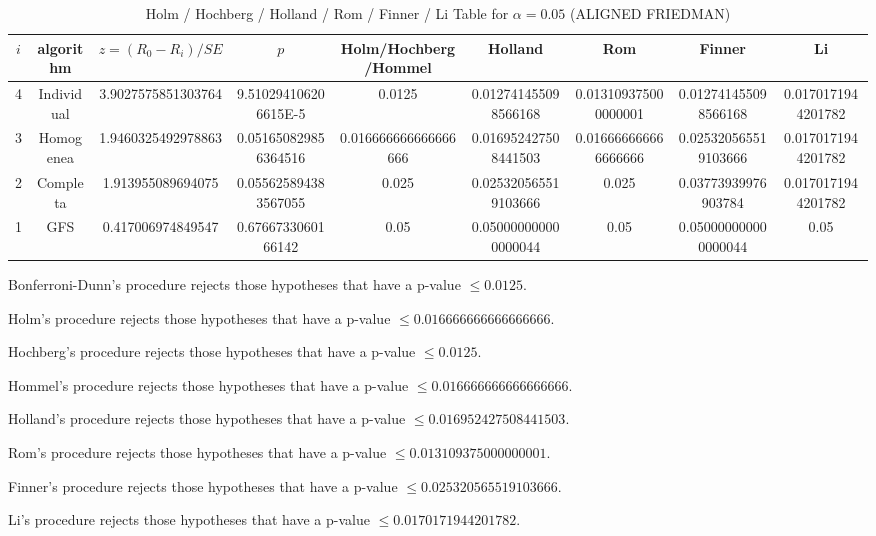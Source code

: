 \documentclass[a4paper,10pt]{article}
\begin{document}
\begin{landscape}
\begin{table}[!htp]
\centering\scriptsize
\caption{Holm / Hochberg / Holland / Rom / Finner / Li Table for $\alpha=0.05$ (ALIGNED FRIEDMAN)}
\begin{tabular}{ccccccccc}
$i$&algorithm&$z=(R_0 - R_i)/SE$&$p$&Holm/Hochberg/Hommel&Holland&Rom&Finner&Li\\
\hline
4&Individual&3.9027575851303764&9.510294106206615E-5&0.0125&0.012741455098566168&0.013109375000000001&0.012741455098566168&0.0170171944201782\\
3&Homogenea&1.9460325492978863&0.051650829856364516&0.016666666666666666&0.016952427508441503&0.016666666666666666&0.025320565519103666&0.0170171944201782\\
2&Completa&1.913955089694075&0.055625894383567055&0.025&0.025320565519103666&0.025&0.03773939976903784&0.0170171944201782\\
1&GFS&0.417006974849547&0.6766733060166142&0.05&0.050000000000000044&0.05&0.050000000000000044&0.05\\
\hline
\end{tabular}
\end{table}
Bonferroni-Dunn's procedure rejects those hypotheses that have a p-value $\le0.0125$.


Holm's procedure rejects those hypotheses that have a p-value $\le0.016666666666666666$.


Hochberg's procedure rejects those hypotheses that have a p-value $\le0.0125$.


Hommel's procedure rejects those hypotheses that have a p-value $\le0.016666666666666666$.


Holland's procedure rejects those hypotheses that have a p-value $\le0.016952427508441503$.


Rom's procedure rejects those hypotheses that have a p-value $\le0.013109375000000001$.


Finner's procedure rejects those hypotheses that have a p-value $\le0.025320565519103666$.


Li's procedure rejects those hypotheses that have a p-value $\le0.0170171944201782$.



\newpage


\end{landscape}
\end{document}
